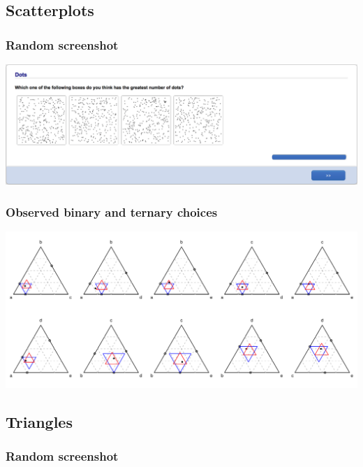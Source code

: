 \documentclass[11pt,letter]{article}
\begin{document}
\pagebreak

\subsection*{Scatterplots}



\subsubsection*{Random screenshot}

\includegraphics[width=15cm]{Population_study_design/screenshot_dots.png}

\subsubsection*{Observed binary and ternary choices}

\includegraphics[width=15cm]{./Population_study_data/Simplexes/dots.pdf}

\pagebreak

\subsection*{Triangles}



\subsubsection*{Random screenshot}
\end{document}
